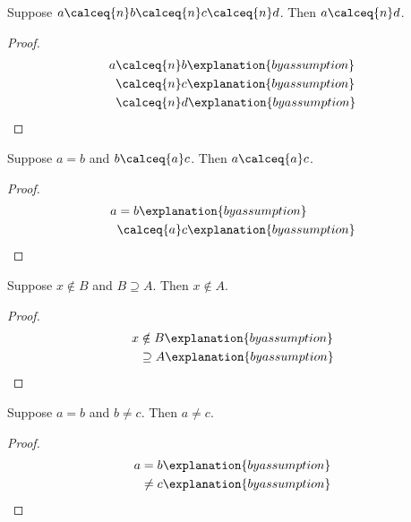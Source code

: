 

\begin{proposition}\label{calculation_form_parameters}
    Suppose $a\calceq{n}b\calceq{n}c\calceq{n}d$.
    Then $a\calceq{n}d$.
\end{proposition}
\begin{proof}
    \begin{align*}
        a
            &\calceq{n} b
                \explanation{by assumption}
                \\
            &\calceq{n} c
                \explanation{by assumption}
                \\
            &\calceq{n} d
                \explanation{by assumption}
    \end{align*}
\end{proof}

\begin{proposition}\label{calculation_form_coinciding_capture}
    Suppose $a=b$ and $b\calceq{a}c$.
    Then $a\calceq{a}c$.
\end{proposition}
\begin{proof}
    \begin{align*}
        a
            &= b
                \explanation{by assumption}
                \\
            &\calceq{a} c
                \explanation{by assumption}
    \end{align*}
\end{proof}

\begin{proposition}\label{calculation_form_negative}
    Suppose $x\notin B$ and $B\supseteq A$.
    Then $x\notin A$.
\end{proposition}
\begin{proof}
    \begin{align*}
        x
            &\notin B
                \explanation{by assumption}
                \\
            &\supseteq A
                \explanation{by assumption}
    \end{align*}
\end{proof}

\begin{proposition}\label{calculation_form_disequality_left}
    Suppose $a=b$ and $b\neq c$.
    Then $a\neq c$.
\end{proposition}
\begin{proof}
    \begin{align*}
        a
            &= b
                \explanation{by assumption}
                \\
            &\neq c
                \explanation{by assumption}
    \end{align*}
\end{proof}

